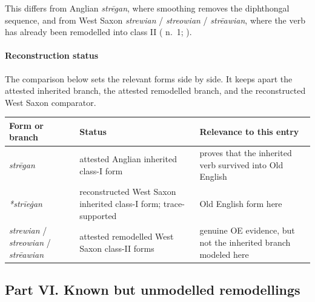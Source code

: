 \documentclass[
  british,
  a4paper,
]{article}
\newcounter{none} %
\begin{document}
This differs from Anglian \emph{strēgan}, where smoothing removes the
diphthongal sequence, and from West Saxon \emph{strewian} /
\emph{streowian} / \emph{strēawian}, where the verb has already been
remodelled into class II (
n.~1; ).

\paragraph{Reconstruction status}\label{reconstruction-status-1}

The comparison below sets the relevant forms side by side. It keeps
apart the attested inherited branch, the attested remodelled branch, and
the reconstructed West Saxon comparator.

{\def\LTcaptype{none} %
\begin{longtable}[]{@{}
  >{\raggedright\arraybackslash}p{}
  >{\raggedright\arraybackslash}p{}
  >{\raggedright\arraybackslash}p{}@{}}
\toprule\noalign{}
\begin{minipage}[b]{\linewidth}\raggedright
Form or branch
\end{minipage} & \begin{minipage}[b]{\linewidth}\raggedright
Status
\end{minipage} & \begin{minipage}[b]{\linewidth}\raggedright
Relevance to this entry
\end{minipage} \\
\midrule\noalign{}
\endhead
\bottomrule\noalign{}
\endlastfoot
\emph{strēgan} & attested Anglian inherited class-I form & proves that
the inherited verb survived into Old English \\
\emph{*strīeġan} & reconstructed West Saxon inherited class-I form;
trace-supported & Old English form here \\
\emph{strewian} / \emph{streowian} / \emph{strēawian} & attested
remodelled West Saxon class-II forms & genuine OE evidence, but not the
inherited branch modeled here \\
\end{longtable}
}

\clearpage

\subsection{Part VI. Known but unmodelled
remodellings}\label{part-vi.-known-but-unmodelled-remodellings}
\end{document}
